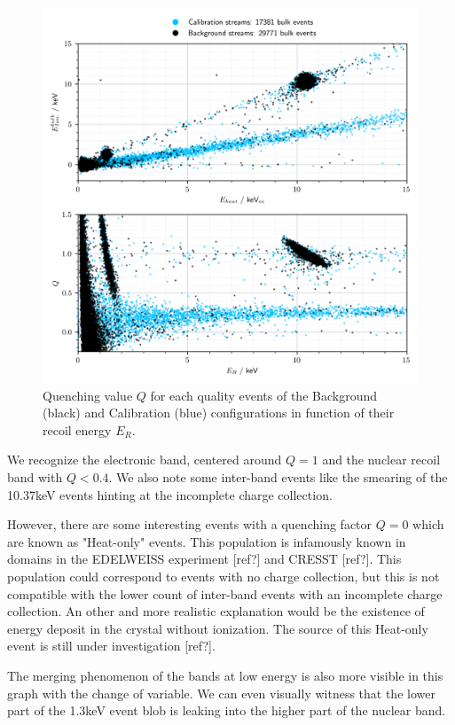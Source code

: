 \begin{figure}
\centering
\includegraphics[width=\linewidth,]{Figures/Neutron/background_calibration_comparison.png}
\caption{Quenching value $Q$ for each quality events of the Background (black) and Calibration (blue) configurations in function of their recoil energy $E_R$.}
\label{fig:quenching_plot}
\end{figure}

We recognize the electronic band, centered around $Q=1$ and the nuclear recoil band with $Q<0.4$. We also note some inter-band events like the smearing of the 10.37keV events hinting at the incomplete charge collection.

However, there are some interesting events with a quenching factor $Q=0$ which are known as "Heat-only" events. This population is infamously known in domains in the EDELWEISS experiment [ref?] and CRESST [ref?]. This population could correspond to events with no charge collection, but this is not compatible with the lower count of inter-band events with an incomplete charge collection. An other and more realistic explanation would be the existence of energy deposit in the crystal without ionization. The source of this Heat-only event is still under investigation [ref?].

The merging phenomenon of the bands at low energy is also more visible in this graph with the change of variable. We can even visually witness that the lower part of the 1.3keV event blob is leaking into the higher part of the nuclear band.

